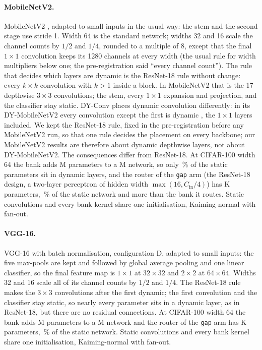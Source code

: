 \documentclass[10pt,a4paper]{article}
\begin{document}
\paragraph{MobileNetV2.} MobileNetV2 \citep{sandler2018mobilenetv2},
adapted to small inputs in the usual way: the stem and the second stage
use stride 1. Width 64 is the standard network; widths 32 and 16 scale the
channel counts by $1/2$ and $1/4$, rounded to a multiple of 8, except that
the final $1\times1$ convolution keeps its 1280 channels at every width (the
usual rule for width multipliers below one; the pre-registration said
``every channel count''). The
rule that decides which layers are dynamic is the ResNet-18 rule without
change: every $k\times k$ convolution with $k>1$ inside a block. In
MobileNetV2 that is the 17 depthwise $3\times3$ convolutions; the stem,
every $1\times1$ expansion and projection, and the classifier stay
static. DY-Conv places dynamic convolution differently: in its
DY-MobileNetV2 every convolution except the first is dynamic
\citep[Section 5.1]{chen2020dynamic}, the $1\times1$ layers included. We kept
the ResNet-18 rule, fixed in the pre-registration before any MobileNetV2
run, so that one rule decides the placement on every backbone; our
MobileNetV2 results are therefore about dynamic depthwise layers, not about
DY-MobileNetV2. The consequences differ from ResNet-18. At CIFAR-100 width 64 the
bank adds M parameters to a M network, so only
\,\% of the static parameters sit in dynamic layers, and the
router of the \texttt{gap} arm (the ResNet-18 design, a two-layer
perceptron of hidden width $\max(16,C_{\text{in}}/4)$) has K
parameters, \,\% of the static network and more than the
bank it routes. Static convolutions and every bank kernel share one
initialisation, Kaiming-normal with fan-out.

\paragraph{VGG-16.} VGG-16 \citep{simonyan2015vgg} with batch
normalisation, configuration D, adapted to small inputs: the five
max-pools are kept and followed by global average pooling and one linear
classifier, so the final feature map is $1\times1$ at $32\times32$ and
$2\times2$ at $64\times64$. Widths 32 and 16 scale all of its channel counts by
$1/2$ and $1/4$. The ResNet-18 rule makes the  $3\times3$
convolutions after the first dynamic; the first convolution and the
classifier stay static, so nearly every parameter sits in a dynamic layer,
as in ResNet-18, but there are no residual connections. At CIFAR-100
width 64 the bank adds M parameters to a M
network and the router of the \texttt{gap} arm has K
parameters, \,\% of the static network. Static
convolutions and every bank kernel share one initialisation,
Kaiming-normal with fan-out.
\end{document}
